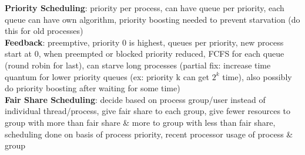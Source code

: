 \documentclass[a4paper]{article}
\begin{document}
\begin{multicols}{2}
        \textbf{Priority Scheduling}: priority per process, can have queue per priority, each queue can have own algorithm, priority boosting needed to prevent starvation (do this for old processes)\\
        \textbf{Feedback}: preemptive, priority 0 is highest, queues per priority, new process start at 0, when preempted or blocked priority reduced, FCFS for each queue (round robin for last), can starve long processes (partial fix: increase time quantum for lower priority queues (ex: priority k can get $2^k$ time), also possibly do priority boosting after waiting for some time)\\
        \textbf{Fair Share Scheduling}: decide based on process group/user instead of individual thread/process, give fair share to each group, give fewer resources to group with more than fair share \& more to group with less than fair share, scheduling done on basis of process priority, recent processor usage of process \& group\\
    \end{multicols}
    
\end{document}
